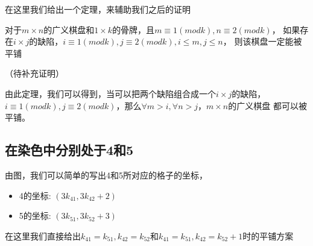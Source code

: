 在这里我们给出一个定理，来辅助我们之后的证明
\begin{theorem}
	\label{basic-theorem-2}
	对于$m \times n$的广义棋盘和$1 \times k$的骨牌，且$m \equiv 1 (mod k), n \equiv 2 (mod k)$，
	如果存在$i \times j$的缺陷，$i \equiv 1 (mod k), j \equiv 2 (mod k), i \le m, j \le n$，
	则该棋盘一定能被平铺
\end{theorem}
（待补充证明）

由此定理，我们可以得到，当可以把两个缺陷组合成一个$i \times j$的缺陷，$i \equiv 1 (mod k), j \equiv 2 (mod k)$，那么$\forall m > i, \forall n > j$，$m \times n$的广义棋盘
都可以被平铺。

\subsection{在染色中分别处于4和5}

由图，我们可以简单的写出4和5所对应的格子的坐标，

\begin{itemize}
	\item 4的坐标: $(3k_{41}, 3k_{42} + 2)$
	\item 5的坐标: $(3k_{51}, 3k_{52} + 3)$
\end{itemize}

在这里我们直接给出$k_{41}=k_{51}, k_{42} = k_{52}$和$k_{41}=k_{51}, k_{42} = k_{52} + 1$时的平铺方案

